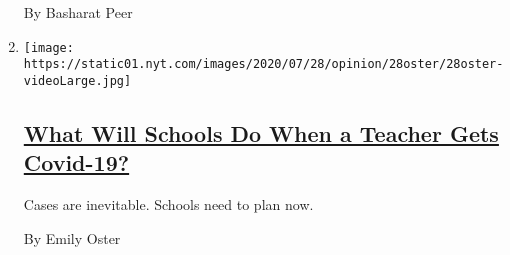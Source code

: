 \begin{enumerate}
  By Basharat Peer
\item
  \texttt{[image: https://static01.nyt.com/images/2020/07/28/opinion/28oster/28oster-videoLarge.jpg]}

  \hypertarget{what-will-schools-do-when-a-teacher-gets-covid-19}{%
  \subsection{\texorpdfstring{\href{/2020/07/28/opinion/coronavirus-schools-reopening.html}{What
  Will Schools Do When a Teacher Gets
  Covid-19?}}{What Will Schools Do When a Teacher Gets Covid-19?}}\label{what-will-schools-do-when-a-teacher-gets-covid-19}}

  Cases are inevitable. Schools need to plan now.

  By Emily Oster
\end{enumerate}

